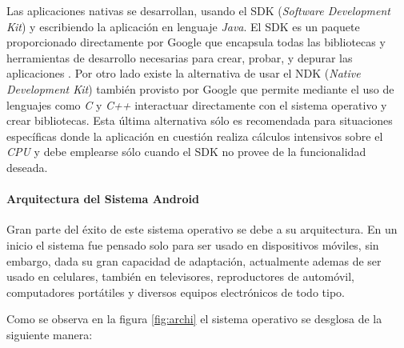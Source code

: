 Las aplicaciones nativas se desarrollan, usando el SDK (\textit{Software Development Kit}) y escribiendo la aplicación en lenguaje \textit{Java}. El SDK es un paquete proporcionado directamente por Google que encapsula todas las bibliotecas y herramientas de desarrollo necesarias para crear, probar, y depurar las aplicaciones \cite{ASDK}. Por otro lado existe la alternativa de usar el NDK (\textit{Native Development Kit}) también provisto por Google que permite mediante el uso de lenguajes como \textit{C} y \textit{C++} interactuar directamente con el sistema operativo y crear bibliotecas. Esta última alternativa sólo es recomendada para situaciones específicas donde la aplicación en cuestión realiza cálculos intensivos sobre el \textit{CPU} y debe emplearse sólo cuando el SDK no provee de la funcionalidad deseada\cite{ANDK}.

\paragraph{Arquitectura del Sistema Android}\mbox{}

Gran parte del éxito de este sistema operativo se debe a su arquitectura. En un inicio el sistema fue pensado solo para ser usado en dispositivos móviles, sin embargo, dada su gran capacidad de adaptación, actualmente ademas de ser usado en celulares, también en televisores, reproductores de automóvil, computadores portátiles y diversos equipos electrónicos de todo tipo.

Como se observa en la figura \ref{fig:archi} el sistema operativo se desglosa de la siguiente manera:

